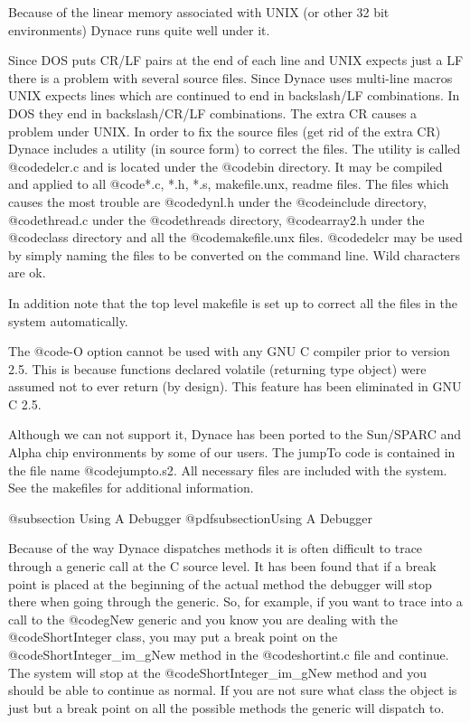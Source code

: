 Because of the linear memory associated with UNIX (or other 32 bit
environments) Dynace runs quite well under it.

Since DOS puts CR/LF pairs at the end of each line and UNIX expects just
a LF there is a problem with several source files.  Since Dynace uses
multi-line macros UNIX expects lines which are continued to end in
backslash/LF combinations.  In DOS they end in backslash/CR/LF
combinations.  The extra CR causes a problem under UNIX.  In order to
fix the source files (get rid of the extra CR) Dynace includes a utility
(in source form) to correct the files.  The utility is called
@code{delcr.c} and is located under the @code{bin} directory.  It may be
compiled and applied to all @code{*.c, *.h, *.s, makefile.unx, readme}
files.  The files which causes the most trouble are
@code{dynl.h} under the @code{include} directory, @code{thread.c}
under the @code{threads} directory, @code{array2.h} under the
@code{class} directory and all the @code{makefile.unx} files.
@code{delcr} may be used by simply naming the files to be converted on
the command line.  Wild characters are ok.

In addition note that the top level makefile is set up to correct
all the files in the system automatically.

The @code{-O} option cannot be used with any GNU C compiler prior to
version 2.5.  This is because functions declared volatile (returning
type object) were assumed not to ever return (by design).  This
feature has been eliminated in GNU C 2.5.

Although we can not support it, Dynace has been ported to the Sun/SPARC
and Alpha chip environments by some of our users.  The jumpTo code is
contained in the file name @code{jumpto.s2}.  All necessary files are
included with the system.  See the makefiles for additional information.

@subsection Using A Debugger
@pdfsubsection{Using A Debugger}

Because of the way Dynace dispatches methods it is often difficult to
trace through a generic call at the C source level.  It has been found
that if a break point is placed at the beginning of the actual method
the debugger will stop there when going through the generic.  So, for
example, if you want to trace into a call to the @code{gNew} generic and
you know you are dealing with the @code{ShortInteger} class, you may put
a break point on the @code{ShortInteger_im_gNew} method in the
@code{shortint.c} file and continue.  The system will stop at the
@code{ShortInteger_im_gNew} method and you should be able to continue as
normal.  If you are not sure what class the object is just but a break
point on all the possible methods the generic will dispatch to.

